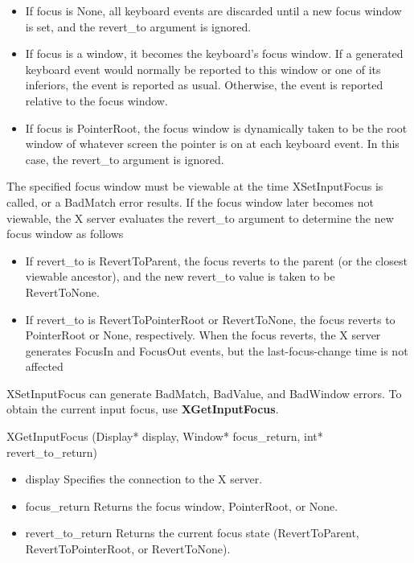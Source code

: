 \documentclass{report}
\begin{document}
\begin{itemize}
\begin{itemize}
                \item If focus is None, all keyboard events are discarded until a new focus window is set, and the revert\_to argument is ignored.
                \item If focus is a window, it becomes the keyboard’s focus window. If a generated keyboard event would normally be reported to this window or one of its inferiors, the event is reported as usual. Otherwise, the event is reported relative to the focus window.
                \item If focus is PointerRoot, the focus window is dynamically taken to be the root window of whatever screen the pointer is on at each keyboard event. In this case, the revert\_to argument is ignored.
            \end{itemize}
            \bigbreak \noindent 
            The specified focus window must be viewable at the time XSetInputFocus is called, or a BadMatch error results. If the focus window later becomes not viewable, the X server evaluates the revert\_to argument to determine the new focus window as follows
            \begin{itemize}
                \item If revert\_to is RevertToParent, the focus reverts to the parent (or the closest viewable ancestor), and the new revert\_to value is taken to be RevertToNone.
                \item If revert\_to is RevertToPointerRoot or RevertToNone, the focus reverts to PointerRoot or None, respectively. When the focus reverts, the X server generates FocusIn and FocusOut events, but the last-focus-change time is not affected
            \end{itemize}
            XSetInputFocus can generate BadMatch, BadValue, and BadWindow errors.
            \bigbreak \noindent 
            To obtain the current input focus, use \textbf{XGetInputFocus}.
            \bigbreak \noindent  
            \begin{cppcode}
            XGetInputFocus (Display* display, Window* focus_return, int* revert_to_return)
            \end{cppcode}
            \begin{itemize}
                \item display Specifies the connection to the X server.
                \item focus\_return Returns the focus window, PointerRoot, or None.
                \item revert\_to\_return Returns the current focus state (RevertToParent, RevertToPointerRoot, or RevertToNone).

\end{itemize}
\end{itemize}
\end{document}
